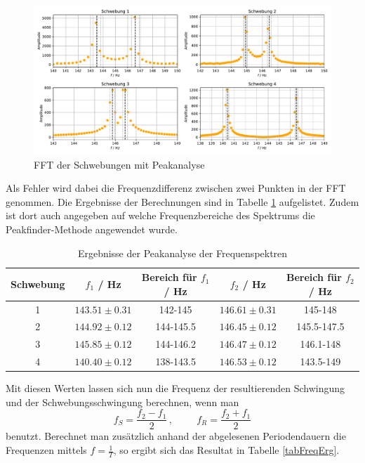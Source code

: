 \begin{figure}[H]
	\centering
	\includegraphics[width=\linewidth]{plots/FFT_freq.pdf}
	\caption{FFT der Schwebungen mit Peakanalyse}
	\label{fftPeakSch}
\end{figure}
Als Fehler wird dabei die Frequenzdifferenz zwischen zwei Punkten in der FFT genommen. Die Ergebnisse der Berechnungen sind in Tabelle \ref{tabFFTpeakSch} aufgelistet. Zudem ist dort auch angegeben auf welche Frequenzbereiche des Spektrums die Peakfinder-Methode angewendet wurde.

\begin{table}[H]
\centering
\begin{tabular}{c|c|c|c|c}
Schwebung & $f_1$ / Hz & Bereich für $f_1$ / Hz & $f_2$ / Hz & Bereich für $f_2$ / Hz \\
\hline
1 & $ 143.51 \pm 0.31$ & 142-145 & $ 146.61 \pm 0.31$ & 145-148 \\
2 & $ 144.92 \pm 0.12$ & 144-145.5 & $ 146.45 \pm 0.12$ & 145.5-147.5 \\
3 & $ 145.85 \pm 0.12$ & 144-146.2 & $ 146.47 \pm 0.12$ & 146.1-148 \\
4 & $ 140.40 \pm 0.12$ & 138-143.5 & $ 146.53 \pm 0.12$ & 143.5-149 
\end{tabular}
\caption{Ergebnisse der Peakanalyse der Frequenspektren}
\label{tabFFTpeakSch}
\end{table}
Mit diesen Werten lassen sich nun die Frequenz der resultierenden Schwingung und der Schwebungsschwingung berechnen, wenn man
$$f_S = \frac{f_2-f_1}2 \, , \hspace{1cm} f_R = \frac{f_2+f_1}2$$
benutzt. Berechnet man zusätzlich anhand der abgelesenen Periodendauern die Frequenzen mittels $f = \frac 1T$, so ergibt sich das Resultat in Tabelle \ref{tabFreqErg}.


